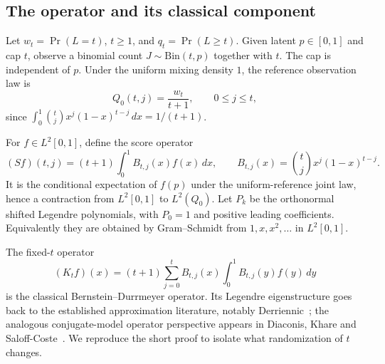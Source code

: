 \documentclass[11pt,a4paper]{article}
\theoremstyle{definition}\newtheorem{definition}[theorem]{Definition}
\theoremstyle{remark}\newtheorem{remark}[theorem]{Remark}
\numberwithin{equation}{section}
\begin{document}
\subsection{The operator and its classical component}\label{M08-sec-1}
Let $w_t=\Pr(L=t)$, $t\ge1$, and $q_t=\Pr(L\ge t)$. Given latent $p\in[0,1]$ and cap $t$, observe a binomial count $J\sim\mathrm{Bin}(t,p)$ together with $t$. The cap is independent of $p$. Under the uniform mixing density $1$, the reference observation law is
\[
 Q_0(t,j)=\frac{w_t}{t+1},\qquad 0\le j\le t,
\]
since $\int_0^1\binom{t}{j}x^j(1-x)^{t-j}\,dx=1/(t+1)$.

For $f\in L^2[0,1]$, define the score operator
\[
 (Sf)(t,j)=(t+1)\int_0^1 B_{t,j}(x)f(x)\,dx,
 \qquad B_{t,j}(x)=\binom{t}{j}x^j(1-x)^{t-j}.
\]
It is the conditional expectation of $f(p)$ under the uniform-reference joint law, hence a contraction from $L^2[0,1]$ to $L^2(Q_0)$. Let $P_k$ be the orthonormal shifted Legendre polynomials, with $P_0=1$ and positive leading coefficients. Equivalently they are obtained by Gram--Schmidt from $1,x,x^2,\ldots$ in $L^2[0,1]$.

The fixed-$t$ operator
\[
 (K_tf)(x)=(t+1)\sum_{j=0}^tB_{t,j}(x)\int_0^1B_{t,j}(y)f(y)\,dy
\]
is the classical Bernstein--Durrmeyer operator. Its Legendre eigenstructure goes back to the established approximation literature, notably Derriennic~\cite{ref021}; the analogous conjugate-model operator perspective appears in Diaconis, Khare and Saloff-Coste~\cite{ref022}. We reproduce the short proof to isolate what randomization of $t$ changes.
\end{document}
